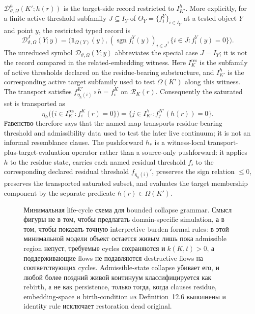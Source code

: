 \(\mathcal{D}^{h}_{\vartheta,\Omega}(K';h(r))\) is the target-side record
restricted to \(I_{K'}^{h}\). More explicitly, for a finite active threshold
subfamily \(J\subseteq I_Y\) of
\(\Theta_Y=\{f_i^Y\}_{i\in I_Y}\) at a tested object \(Y\) and point \(y\), the
restricted typed record is
\[
  \mathcal{D}^{J}_{\vartheta,\Omega}(Y;y)=
  \big(
    \mathbf{1}_{\Omega(Y)}(y),
    (\operatorname{sgn} f_i^Y(y))_{i\in J},
    \{i\in J:f_i^Y(y)=0\}
  \big).
\]
The unreduced symbol \(\mathcal{D}_{\vartheta,\Omega}(Y;y)\) abbreviates the
special case \(J=I_Y\); it is not the record compared in the related-embedding
witness.
Here \(I_K^{\mathrm{res}}\) is the subfamily of active thresholds declared on
the residue-bearing substructure, and \(I_{K'}^{h}\) is the corresponding
active target subfamily used to test \(\Omega(K')\) along this witness. The
transport satisfies
\(f_{\eta_h(i)}^{K'}\circ h=f_i^K\) on \(\mathcal{R}_K(r)\).
Consequently the saturated set is transported as
\[
  \eta_h\bigl(\{i\in I_K^{\mathrm{res}}:f_i^K(r)=0\}\bigr)
  =
  \{j\in I_{K'}^{h}:f_j^{K'}(h(r))=0\}.
\]
Равенство therefore says that the named map transports residue-bearing
threshold and admissibility data used to test the later live continuum; it is
not an informal resemblance clause. The pushforward \(h_{\ast}\) is a
witness-local transport-plus-target-evaluation operator rather than a
source-only pushforward: it applies \(h\) to the residue state, carries each
named residual threshold \(f_i\) to the corresponding declared residual
threshold \(f_{\eta_h(i)}'\), preserves the sign relation \(\le 0\),
preserves the transported saturated subset, and evaluates the target
membership component by the separate predicate \(h(r)\in\Omega(K')\).

\begin{figure}[htbp]
\centering

\caption{Минимальная life-cycle схема для bounded collapse grammar. Смысл
фигуры не в том, чтобы предлагать domain-specific simulation, а в том, чтобы
показать точную interpretive burden formal rules: в этой минимальной модели
объект остается живым лишь пока admissible region непуст, требуемые cycles
сохраняются и \(k(K,t)>0\), а поддерживающие flows не подавляются
destructive flows на соответствующих cycles. Admissible-state collapse убивает
его, и любой более поздний живой континуум классифицируется как rebirth, а не
как persistence, только тогда, когда clauses residue, embedding-space и
birth-condition из Definition~12.6 выполнены и identity rule исключает
restoration dead original.}
\label{fig:oc13-birth-life-death}
\end{figure}

